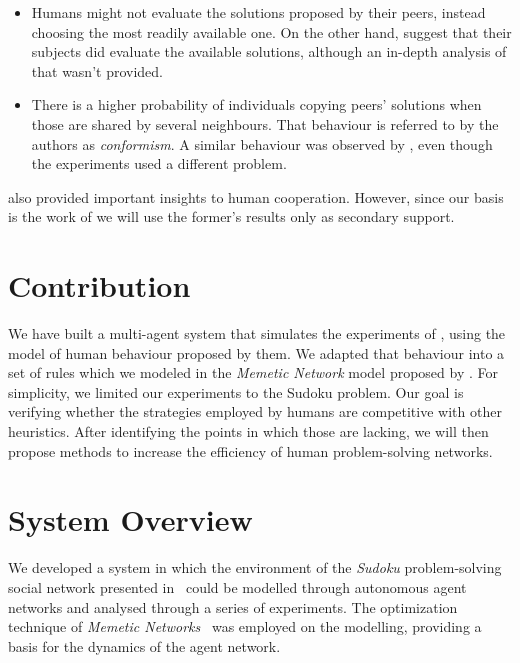 \documentclass{article}
\begin{document}
\begin{itemize}
	\item Humans might not evaluate the solutions proposed by their peers, instead choosing the most readily available one. On the other hand, \cite{mason:collablearnet} suggest that their subjects did evaluate the available solutions, although an in-depth analysis of that wasn't provided.
	\item There is a higher probability of individuals copying peers' solutions when those are shared by several neighbours. That behaviour is referred to by the authors as \emph{conformism}. A similar behaviour was observed by \cite{mason:collablearnet}, even though the experiments used a different problem.
\end{itemize}

\cite{mason:collablearnet} also provided important insights to human cooperation. However, since our basis is the work of \cite{farenzena:collabem} we will use the former's results only as secondary support.

\section{Contribution}

We have built a multi-agent system that simulates the experiments of \cite{farenzena:collabem}, using the model of human behaviour proposed by them. We adapted that behaviour into a set of rules which we modeled in the \emph{Memetic Network} model proposed by \cite{lamb:memenet}. For simplicity, we limited our experiments to the Sudoku problem. Our goal is verifying whether the strategies employed by humans are competitive with other heuristics. After identifying the points in which those are lacking, we will then propose methods to increase the efficiency of human problem-solving networks.

\section{System Overview}

We developed a system in which the environment of the {\em Sudoku} problem-solving social network presented in~\cite{farenzena:collabem} could be modelled through autonomous agent networks and analysed through a series of experiments. The optimization technique of {\em Memetic Networks}~\cite{lamb:memenet} was employed on the modelling, providing a basis for the dynamics of the agent network.
\end{document}
